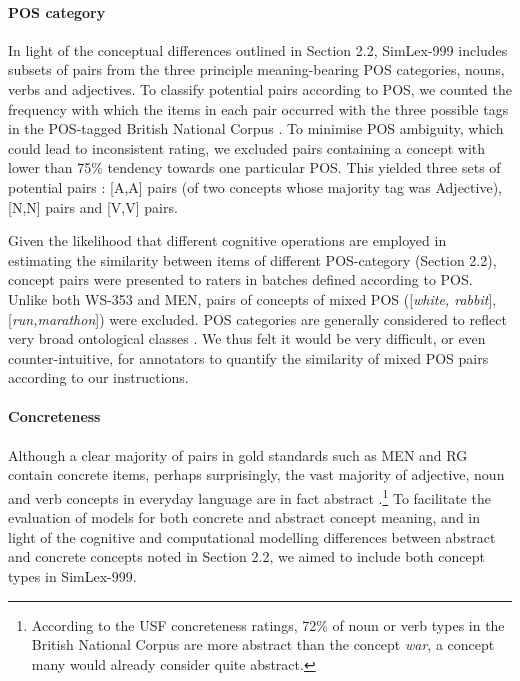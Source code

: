 \paragraph{POS category} In light of the conceptual differences outlined in Section 2.2, SimLex-999 includes subsets of pairs from the three principle meaning-bearing POS categories, nouns, verbs and adjectives. To classify potential pairs according to POS, we counted the frequency with which the items in each pair occurred with the three possible tags in the  POS-tagged British National Corpus \cite{leech1994claws4}. To minimise POS ambiguity, which could lead to inconsistent rating, we excluded pairs containing a concept with lower than 75\% tendency towards one particular POS. This yielded three sets of potential pairs : [A,A] pairs (of two concepts whose majority tag was Adjective), [N,N] pairs and [V,V] pairs. 

Given the likelihood that different cognitive operations are employed in estimating the similarity between items of different POS-category (Section 2.2), concept pairs were presented to raters in batches defined according to POS. Unlike both WS-353 and MEN, pairs of concepts of mixed POS ([\emph{white, rabbit}], [\emph{run,marathon}]) were excluded. POS categories are generally considered to reflect very broad ontological classes \cite{fellbaum1999wordnet}. We thus felt it would be very difficult, or even counter-intuitive, for annotators to quantify the similarity of mixed POS pairs according to our instructions. 

\paragraph{Concreteness} Although a clear majority of pairs in gold standards such as MEN and RG contain concrete items, perhaps surprisingly, the vast majority of adjective, noun and verb concepts in everyday language are in fact abstract \cite{hill2014multi,kielaimproving}.\footnote{According to the USF concreteness ratings, 72\% of noun or verb types in the British National Corpus are more abstract than the concept \emph{war}, a concept many would already consider quite abstract.} To facilitate the evaluation of models for both concrete and abstract concept meaning, and in light of the cognitive and computational modelling differences  between abstract and concrete concepts noted in Section 2.2, we aimed to include both concept types in SimLex-999. 

